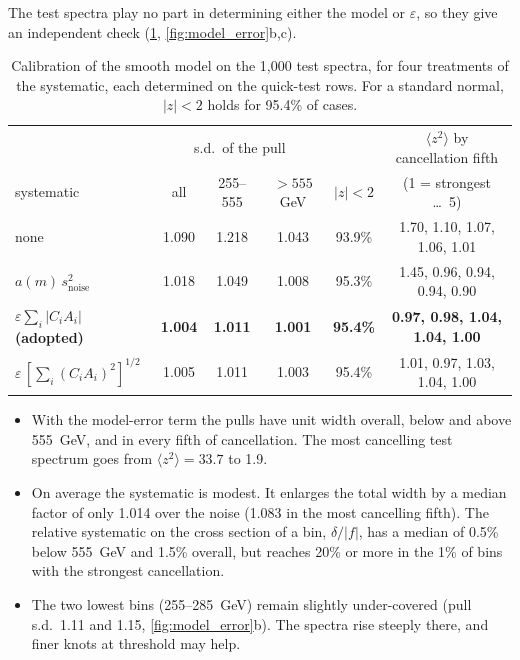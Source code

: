 \documentclass[11pt]{article}
\newcommand{\snoise}{s_{\text{noise}}}
\begin{document}
The test spectra play no part in determining either the model or $\varepsilon$, so they give
an independent check (\cref{tab:calib}, \cref{fig:model_error}b,c).

\begin{table}[h]
\centering
\footnotesize
\setlength{\tabcolsep}{4pt}
\begin{tabular}{lccccc}
\toprule
 & \multicolumn{3}{c}{s.d.\ of the pull} & & $\langle z^2\rangle$ by cancellation fifth\\
systematic & all & 255--555 & $>555$ GeV & $|z|<2$ & (1 = strongest \dots\ 5)\\
\midrule
none & 1.090 & 1.218 & 1.043 & 93.9\% & 1.70, 1.10, 1.07, 1.06, 1.01\\
$a(m)\,\snoise^2$ & 1.018 & 1.049 & 1.008 & 95.3\% & 1.45, 0.96, 0.94, 0.94, 0.90\\
\textbf{$\varepsilon\sum_i|C_iA_i|$ (adopted)} & \textbf{1.004} & \textbf{1.011} & \textbf{1.001} & \textbf{95.4\%} & \textbf{0.97, 0.98, 1.04, 1.04, 1.00}\\
$\varepsilon\,[\sum_i(C_iA_i)^2]^{1/2}$ & 1.005 & 1.011 & 1.003 & 95.4\% & 1.01, 0.97, 1.03, 1.04, 1.00\\
\bottomrule
\end{tabular}
\caption{Calibration of the smooth model on the 1,000 test spectra, for four treatments of the
systematic, each determined on the quick-test rows. For a standard normal, $|z|<2$ holds for
95.4\% of cases.}
\label{tab:calib}
\end{table}

\begin{itemize}
  \item With the model-error term the pulls have unit width overall, below and above 555~GeV,
    and in every fifth of cancellation. The most cancelling test spectrum goes from
    $\langle z^2\rangle = 33.7$ to 1.9.
  \item On average the systematic is modest. It enlarges the total width by a median factor of
    only 1.014 over the noise (1.083 in the most cancelling fifth). The relative systematic on
    the cross section of a bin, $\delta/|f|$, has a median of 0.5\% below 555~GeV and 1.5\%
    overall, but reaches 20\% or more in the 1\% of bins with the strongest cancellation.
  \item The two lowest bins (255--285~GeV) remain slightly under-covered (pull s.d.\ 1.11 and
    1.15, \cref{fig:model_error}b). The spectra rise steeply there, and finer knots at threshold
    may help.
\end{itemize}
\end{document}
